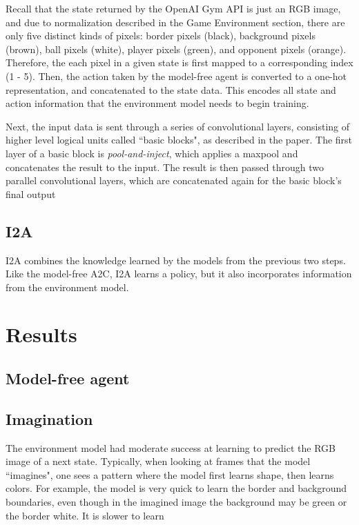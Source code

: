 \documentclass[10pt, twocolumn]{article}
\begin{document}
Recall that the state returned by the OpenAI Gym API is just an RGB image, and due to normalization 
described in the Game Environment section, there are only five distinct kinds of pixels: border pixels (black),
background pixels (brown), ball pixels (white), player pixels (green), and opponent pixels (orange).
Therefore, the each pixel in a given state is first mapped to a corresponding index (1 - 5). Then, the action
taken by the model-free agent is converted to a one-hot representation, and concatenated to the
state data. This encodes all state and action information that the environment model needs to begin training.

Next, the input data is sent through a series of convolutional layers, consisting of higher level logical units
called ``basic blocks", as described in the paper. The first layer of a basic block is \emph{pool-and-inject},
which applies a maxpool and concatenates the result to the input. The result is then passed through
two parallel convolutional layers, which are concatenated again for the basic block's final output



\subsection{I2A}

I2A combines the knowledge learned by the models from the previous two steps. Like the model-free A2C, I2A learns a policy, but it also incorporates information from the environment model.

\section{Results}

\subsection{Model-free agent}

\subsection{Imagination}

The environment model had moderate success at learning to predict the RGB image of a next state. Typically, when looking at frames
that the model ``imagines", one sees a pattern where the model first learns shape, then learns colors. For example, the model is very quick to learn the border and background boundaries, even though in the imagined image the background may be green or the border white. It is slower to learn 
\end{document}
